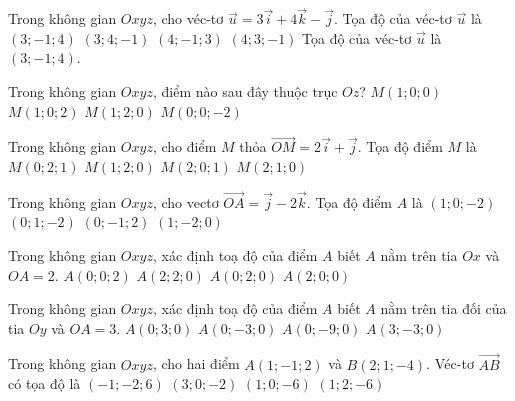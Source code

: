 \begin{ex}
	Trong không gian $Oxyz$, cho véc-tơ $\overrightarrow{u}=3\overrightarrow{i}+4\overrightarrow{k}-\overrightarrow{j}$. Tọa độ của véc-tơ $\overrightarrow{u}$ là
	\choice
	{\True $(3;-1;4)$}
	{$(3;4;-1)$}
	{$(4;-1;3)$}
	{$(4;3;-1)$}
	\loigiai
	{
		Tọa độ của véc-tơ $\overrightarrow{u}$ là $(3;-1;4)$.
	}
\end{ex} 

\begin{ex}
	Trong không gian $Oxyz$, điểm nào sau đây thuộc trục $Oz$?
	\choice
	{$M(1;0;0)$}
	{$M(1;0;2)$}
	{$M(1;2;0)$}
	{\True $M(0;0;-2)$}
\end{ex} 

\begin{ex}%
	Trong không gian $Oxyz$, cho điểm $M$ thỏa $\vec{OM} = 2\vec{i} + \vec{j}$. Tọa độ điểm $M$ là
	\choice
	{$M(0;2;1)$}
	{$M(1;2;0)$}
	{$M(2;0;1)$}
	{\True$M(2;1;0)$}
\end{ex} 

\begin{ex}%
	Trong không gian $Oxyz$, cho vectơ $\overrightarrow{OA}=\overrightarrow{j}-2\overrightarrow{k}$. Tọa độ điểm $A$ là
	\choice
	{$(1;0;-2)$}
	{\True $(0;1;-2)$}
	{$(0;-1;2)$}
	{$(1;-2;0)$}
\end{ex} 

\begin{ex}
	Trong không gian $O x y z$, xác định toạ độ của điểm $A$ biết $A$ nằm trên tia $O x$ và $O A=2$.
	\choice
	{$A(0;0;2)$}
	{$A(2;2;0)$}
	{$A(0;2;0)$}
	{\True $A(2;0;0)$}
\end{ex} 

\begin{ex}
	Trong không gian $O x y z$, xác định toạ độ của điểm $A$ biết $A$ nằm trên tia đối của tia $O y$ và $O A=3$.
	\choice
	{$A(0;3;0)$}
	{\True $A(0;-3;0)$}
	{$A(0;-9;0)$}
	{$A(3;-3;0)$}
\end{ex} 

\begin{ex}
	Trong không gian $Oxyz$, cho hai điểm $A(1;-1;2)$ và $B(2;1;-4)$. Véc-tơ $\vec{AB}$ có tọa độ là
	\choice
	{$(-1;-2;6)$}
	{$(3;0;-2)$}
	{$(1;0;-6)$}
	{\True $(1;2;-6)$}
\end{ex} 

